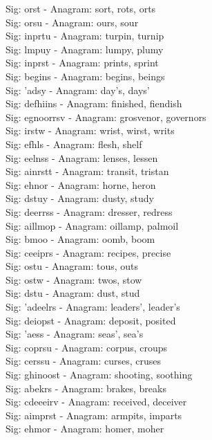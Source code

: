 Sig: {orst} - Anagram: sort, rots, orts \\
Sig: {orsu} - Anagram: ours, sour \\
Sig: {inprtu} - Anagram: turpin, turnip \\
Sig: {lmpuy} - Anagram: lumpy, plumy \\
Sig: {inprst} - Anagram: prints, sprint \\
Sig: {begins} - Anagram: begins, beings \\
Sig: {'adsy} - Anagram: day's, days' \\
Sig: {defhiins} - Anagram: finished, fiendish \\
Sig: {egnoorrsv} - Anagram: grosvenor, governors \\
Sig: {irstw} - Anagram: wrist, wirst, writs \\
Sig: {efhls} - Anagram: flesh, shelf \\
Sig: {eelnss} - Anagram: lenses, lessen \\
Sig: {ainrstt} - Anagram: transit, tristan \\
Sig: {ehnor} - Anagram: horne, heron \\
Sig: {dstuy} - Anagram: dusty, study \\
Sig: {deerrss} - Anagram: dresser, redress \\
Sig: {aillmop} - Anagram: oillamp, palmoil \\
Sig: {bmoo} - Anagram: oomb, boom \\
Sig: {ceeiprs} - Anagram: recipes, precise \\
Sig: {ostu} - Anagram: tous, outs \\
Sig: {ostw} - Anagram: twos, stow \\
Sig: {dstu} - Anagram: dust, stud \\
Sig: {'adeelrs} - Anagram: leaders', leader's \\
Sig: {deiopst} - Anagram: deposit, posited \\
Sig: {'aess} - Anagram: seas', sea's \\
Sig: {coprsu} - Anagram: corpus, croups \\
Sig: {cerssu} - Anagram: curses, cruses \\
Sig: {ghinoost} - Anagram: shooting, soothing \\
Sig: {abekrs} - Anagram: brakes, breaks \\
Sig: {cdeeeirv} - Anagram: received, deceiver \\
Sig: {aimprst} - Anagram: armpits, imparts \\
Sig: {ehmor} - Anagram: homer, moher \\
